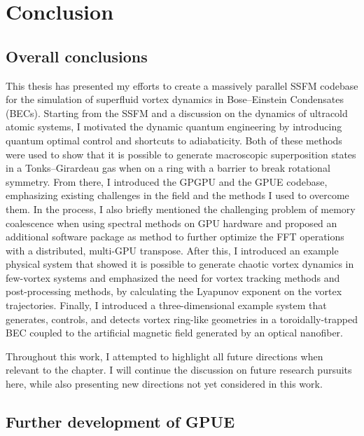 \chapter*{Conclusion}

\section{Overall conclusions}

\label{ch:conclusion}

This thesis has presented my efforts to create a massively parallel SSFM codebase for the simulation of superfluid vortex dynamics in Bose--Einstein Condensates (BECs).
Starting from the SSFM and a discussion on the dynamics of ultracold atomic systems, I motivated the dynamic quantum engineering by introducing quantum optimal control and shortcuts to adiabaticity.
Both of these methods were used to show that it is possible to generate macroscopic superposition states in a Tonks--Girardeau gas when on a ring with a barrier to break rotational symmetry.
From there, I introduced the GPGPU and the GPUE codebase, emphasizing existing challenges in the field and the methods I used to overcome them.
In the process, I also briefly mentioned the challenging problem of memory coalescence when using spectral methods on GPU hardware and proposed an additional software package as method to further optimize the FFT operations with a distributed, multi-GPU transpose.
After this, I introduced an example physical system that showed it is possible to generate chaotic vortex dynamics in few-vortex systems and emphasized the need for vortex tracking methods and post-processing methods, by calculating the Lyapunov exponent on the vortex trajectories.
Finally, I introduced a three-dimensional example system that generates, controls, and detects vortex ring-like geometries in a toroidally-trapped BEC coupled to the artificial magnetic field generated by an optical nanofiber.

Throughout this work, I attempted to highlight all future directions when relevant to the chapter.
I will continue the discussion on future research pursuits here, while also presenting new directions not yet considered in this work.

\section{Further development of GPUE}

